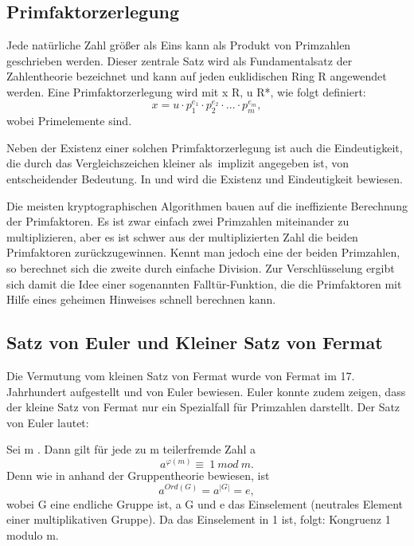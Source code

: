 	\subsection{Primfaktorzerlegung}
	Jede natürliche Zahl größer als Eins kann als Produkt von Primzahlen geschrieben werden. Dieser zentrale Satz wird als Fundamentalsatz der Zahlentheorie bezeichnet und kann auf jeden euklidischen Ring R angewendet werden. Eine Primfaktorzerlegung wird mit x \myin R, u \myin R*,  \myin {} wie folgt definiert:	
	\begin{displaymath}
		x = u \cdot p^{e_1}_1 \cdot p^{e_2}_2 \cdot . . . \cdot p^{e_m}_m,
	\end{displaymath}
	wobei   Primelemente sind.
	
	Neben der Existenz einer solchen Primfaktorzerlegung ist auch die Eindeutigkeit, die durch das Vergleichszeichen \grqq kleiner als\grqq ~implizit angegeben ist, von entscheidender Bedeutung. In \cite{Einfuehrung:in:Algebra:und:Zahlentheorie} und \cite{Algorithmische:Zahlentheorie} wird die Existenz und Eindeutigkeit bewiesen.

	Die meisten kryptographischen Algorithmen bauen auf die ineffiziente Berechnung der Primfaktoren. Es ist zwar einfach zwei Primzahlen miteinander zu multiplizieren, aber es ist schwer aus der multiplizierten Zahl die beiden Primfaktoren zurückzugewinnen. Kennt man jedoch eine der beiden Primzahlen, so berechnet sich die zweite durch einfache Division. Zur Verschlüsselung ergibt sich damit die Idee einer sogenannten Falltür-Funktion, die die Primfaktoren mit Hilfe eines geheimen Hinweises schnell berechnen kann.
		
	\subsection{Satz von Euler und Kleiner Satz von Fermat}
	Die Vermutung vom kleinen Satz von Fermat wurde von Fermat im 17. Jahrhundert aufgestellt und von Euler bewiesen. Euler konnte zudem zeigen, dass der kleine Satz von Fermat nur ein Spezialfall für Primzahlen darstellt. Der Satz von Euler lautet:
	
	Sei m  \myin {}. Dann gilt für jede zu m teilerfremde Zahl a \myin {}
	\begin{displaymath}
		a^{\varphi(m)} \equiv~1~mod~m.
	\end{displaymath}
	Denn wie in \cite{Algorithmische:Zahlentheorie} anhand der Gruppentheorie bewiesen, ist
	\begin{displaymath}
		a^{Ord(G)} = a^{|G|} = e,
	\end{displaymath}
	wobei G eine endliche Gruppe ist, a \myin G und e das Einselement (neutrales Element einer multiplikativen Gruppe). Da das Einselement in  1 ist, folgt: Kongruenz 1 modulo m. 
	
